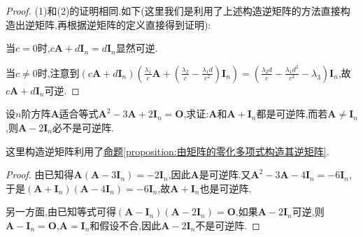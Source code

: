 \documentclass[../../main.tex]{subfiles}%
\begin{document}
\begin{proof}

(1)和(2)的证明相同.如下(这里我们是利用了上述构造逆矩阵的方法直接构造出逆矩阵,再根据逆矩阵的定义直接得到证明):

当\(c = 0\)时,\(c\boldsymbol{A}+d\boldsymbol{I}_n=d\boldsymbol{I}_n\)显然可逆.

当\(c\neq 0\)时,注意到\((c\boldsymbol{A}+d\boldsymbol{I}_n)\left(\frac{\lambda_1}{c}\boldsymbol{A}+\left(\frac{\lambda_2}{c}-\frac{\lambda_1d}{c^2}\right)\boldsymbol{I}_n\right)=\left(\frac{\lambda_2d}{c}-\frac{\lambda_1d^2}{c^2}-\lambda_3\right)\boldsymbol{I}_n\),故\(c\boldsymbol{A}+d\boldsymbol{I}_n\)可逆.

\end{proof}

\begin{example}
设\(n\)阶方阵\(\boldsymbol{A}\)适合等式\(\boldsymbol{A}^{2}-3\boldsymbol{A}+2\boldsymbol{I}_{n}=\boldsymbol{O}\),求证:\(\boldsymbol{A}\)和\(\boldsymbol{A}+\boldsymbol{I}_{n}\)都是可逆阵,而若\(\boldsymbol{A}\neq\boldsymbol{I}_{n}\),则\(\boldsymbol{A}-2\boldsymbol{I}_{n}\)必不是可逆阵.
\end{example}
\begin{note}
这里构造逆矩阵利用了\hyperref[proposition:由矩阵的零化多项式构造其逆矩阵]{命题\ref{proposition:由矩阵的零化多项式构造其逆矩阵}}.
\end{note}
\begin{proof}

由已知得\(\boldsymbol{A}(\boldsymbol{A}-3\boldsymbol{I}_{n})=-2\boldsymbol{I}_{n}\),因此\(\boldsymbol{A}\)是可逆阵.又\(\boldsymbol{A}^{2}-3\boldsymbol{A}-4\boldsymbol{I}_{n}=-6\boldsymbol{I}_{n}\),于是\((\boldsymbol{A}+\boldsymbol{I}_{n})(\boldsymbol{A}-4\boldsymbol{I}_{n})=-6\boldsymbol{I}_{n}\),故\(\boldsymbol{A}+\boldsymbol{I}_{n}\)也是可逆阵.

另一方面,由已知等式可得\((\boldsymbol{A}-\boldsymbol{I}_{n})(\boldsymbol{A}-2\boldsymbol{I}_{n})=\boldsymbol{O}\),如果\(\boldsymbol{A}-2\boldsymbol{I}_{n}\)可逆,则\(\boldsymbol{A}-\boldsymbol{I}_{n}=\boldsymbol{O}\),\(\boldsymbol{A}=\boldsymbol{I}_{n}\)和假设不合,因此\(\boldsymbol{A}-2\boldsymbol{I}_{n}\)不是可逆阵.

\end{proof}
\end{document}
